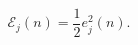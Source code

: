 \begin{equation}
\label{eq:insterrorenergy}
\mathscr{E}_j(n) = \frac{1}{2}
\mathit{e}_j^2(n).
\end{equation}
